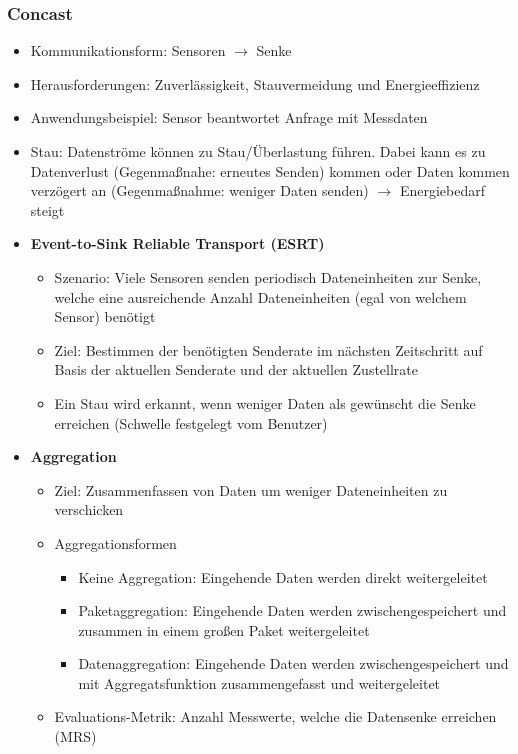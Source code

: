 \subsubsection{Concast}
\begin{itemize}
	\item Kommunikationsform: Sensoren \(\rightarrow\) Senke
	\item Herausforderungen: Zuverlässigkeit, Stauvermeidung und Energieeffizienz
	\item Anwendungsbeispiel: Sensor beantwortet Anfrage mit Messdaten
	\item Stau: Datenströme können zu Stau/Überlastung führen. Dabei kann es zu Datenverlust (Gegenmaßnahe: erneutes Senden) kommen oder Daten kommen verzögert an (Gegenmaßnahme: weniger Daten senden) \(\rightarrow\) Energiebedarf steigt
	\item \textbf{Event-to-Sink Reliable Transport (ESRT)}
	\begin{itemize}
		\item Szenario: Viele Sensoren senden periodisch Dateneinheiten zur Senke, welche eine ausreichende Anzahl Dateneinheiten (egal von welchem Sensor) benötigt
		\item Ziel: Bestimmen der benötigten Senderate im nächsten Zeitschritt auf Basis der aktuellen Senderate und der aktuellen Zustellrate
		\item Ein Stau wird erkannt, wenn weniger Daten als gewünscht die Senke erreichen (Schwelle festgelegt vom Benutzer)
	\end{itemize}
	\item \textbf{Aggregation}
	\begin{itemize}
		\item Ziel: Zusammenfassen von Daten um weniger Dateneinheiten zu verschicken
		\item Aggregationsformen
		\begin{itemize}
			\item Keine Aggregation: Eingehende Daten werden direkt weitergeleitet
			\item Paketaggregation: Eingehende Daten werden zwischengespeichert und zusammen in einem großen Paket weitergeleitet
			\item Datenaggregation: Eingehende Daten werden zwischengespeichert und mit Aggregatsfunktion zusammengefasst und weitergeleitet
		\end{itemize}
		\item Evaluations-Metrik: Anzahl Messwerte, welche die Datensenke erreichen (MRS)
		\begin{itemize}

\end{itemize}
\end{itemize}
\end{itemize}

